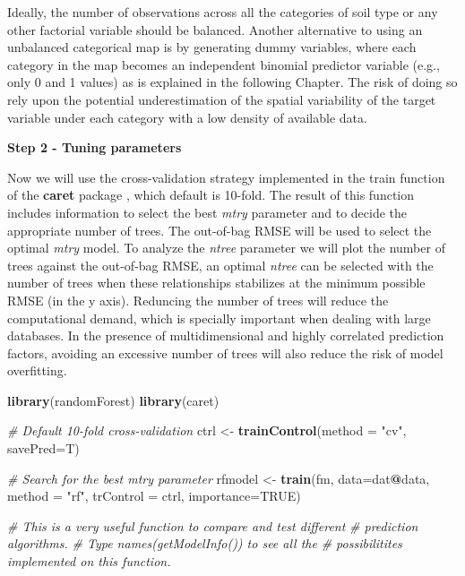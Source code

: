 \documentclass[10pt,b5paper,]{book}
\newenvironment{Shaded}{\begin{snugshade}}{\end{snugshade}}
\newcommand{\CommentTok}[1]{\textcolor[rgb]{0.56,0.35,0.01}{\textit{#1}}}
\newcommand{\DataTypeTok}[1]{\textcolor[rgb]{0.13,0.29,0.53}{#1}}
\newcommand{\KeywordTok}[1]{\textcolor[rgb]{0.13,0.29,0.53}{\textbf{#1}}}
\newcommand{\NormalTok}[1]{#1}
\newcommand{\OperatorTok}[1]{\textcolor[rgb]{0.81,0.36,0.00}{\textbf{#1}}}
\newcommand{\OtherTok}[1]{\textcolor[rgb]{0.56,0.35,0.01}{#1}}
\newcommand{\StringTok}[1]{\textcolor[rgb]{0.31,0.60,0.02}{#1}}
\theoremstyle{definition}
\theoremstyle{definition}
\theoremstyle{definition}
\theoremstyle{remark}
\begin{document}
Ideally, the number of observations across all the categories of soil
type or any other factorial variable should be balanced. Another
alternative to using an unbalanced categorical map is by generating
dummy variables, where each category in the map becomes an independent
binomial predictor variable (e.g., only 0 and 1 values) as is explained
in the following Chapter. The risk of doing so rely upon the potential
underestimation of the spatial variability of the target variable under
each category with a low density of available data.

\textbf{Step 2 - Tuning parameters}

Now we will use the cross-validation strategy implemented in the train
function of the \textbf{caret} package \citep{kuhn2017caret}, which
default is 10-fold. The result of this function includes information to
select the best \emph{mtry} parameter and to decide the appropriate
number of trees. The out-of-bag RMSE will be used to select the optimal
\emph{mtry} model. To analyze the \emph{ntree} parameter we will plot
the number of trees against the out-of-bag RMSE, an optimal \emph{ntree}
can be selected with the number of trees when these relationships
stabilizes at the minimum possible RMSE (in the y axis). Reduncing the
number of trees will reduce the computational demand, which is specially
important when dealing with large databases. In the presence of
multidimensional and highly correlated prediction factors, avoiding an
excessive number of trees will also reduce the risk of model
overfitting.

\begin{Shaded}
\begin{Highlighting}[]
\KeywordTok{library}\NormalTok{(randomForest)}
\KeywordTok{library}\NormalTok{(caret)}

\CommentTok{# Default 10-fold cross-validation}
\NormalTok{ctrl <-}\StringTok{ }\KeywordTok{trainControl}\NormalTok{(}\DataTypeTok{method =} \StringTok{"cv"}\NormalTok{, }\DataTypeTok{savePred=}\NormalTok{T)}

\CommentTok{# Search for the best mtry parameter}
\NormalTok{rfmodel <-}\StringTok{ }\KeywordTok{train}\NormalTok{(fm, }\DataTypeTok{data=}\NormalTok{dat}\OperatorTok{@}\NormalTok{data, }\DataTypeTok{method =} \StringTok{"rf"}\NormalTok{, }\DataTypeTok{trControl =}\NormalTok{ ctrl, }
             \DataTypeTok{importance=}\OtherTok{TRUE}\NormalTok{)}

\CommentTok{# This is a very useful function to compare and test different }
\CommentTok{# prediction algorithms.}
\CommentTok{# Type names(getModelInfo()) to see all the }
\CommentTok{# possibilitites implemented on this function.}
\end{Highlighting}
\end{Shaded}
\end{document}
